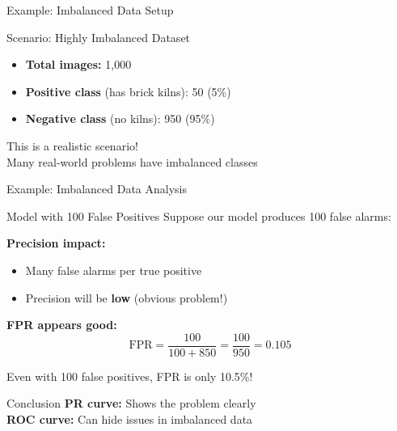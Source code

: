 \documentclass{beamer}
\begin{document}
\begin{frame}{Example: Imbalanced Data Setup}
\begin{examplebox}{Scenario: Highly Imbalanced Dataset}
\small
\begin{itemize}
    \item \textbf{Total images:} 1,000
    \item \textbf{Positive class} (has brick kilns): 50 (5\%)
    \item \textbf{Negative class} (no kilns): 950 (95\%)
\end{itemize}
\end{examplebox}

\vspace{0.2cm}

\begin{center}
\Large
This is a realistic scenario! \\
Many real-world problems have imbalanced classes
\end{center}
\end{frame}

\begin{frame}{Example: Imbalanced Data Analysis}
\begin{alertblock}{Model with 100 False Positives}
\footnotesize
Suppose our model produces 100 false alarms:

\vspace{0.15cm}

\textbf{Precision impact:}
\begin{itemize}
    \item Many false alarms per true positive
    \item Precision will be \textbf{low} (obvious problem!)
\end{itemize}

\vspace{0.15cm}

\textbf{FPR appears good:}
$$\text{FPR} = \frac{100}{100 + 850} = \frac{100}{950} = 0.105$$

Even with 100 false positives, FPR is only 10.5\%!
\end{alertblock}

\footnotesize
\begin{keypointsbox}{Conclusion}
\small
\textbf{PR curve:} Shows the problem clearly \\
\textbf{ROC curve:} Can hide issues in imbalanced data
\end{keypointsbox}
\end{frame}
\end{document}
